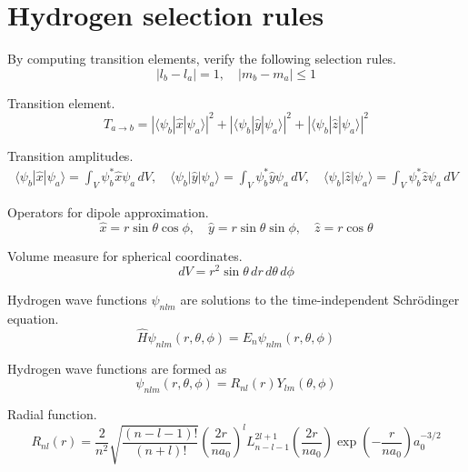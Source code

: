 

\section*{Hydrogen selection rules}

By computing transition elements, verify the following selection rules.
\begin{equation*}
|l_b-l_a|=1,\quad|m_b-m_a|\le1
\end{equation*}

Transition element.
\begin{equation*}
T_{a\rightarrow b}
=|\langle\psi_b|\hat x|\psi_a\rangle|^2
+|\langle\psi_b|\hat y|\psi_a\rangle|^2
+|\langle\psi_b|\hat z|\psi_a\rangle|^2
\end{equation*}

Transition amplitudes.
\begin{gather*}
\langle\psi_b|\hat x|\psi_a\rangle
=\int_V\psi_b^*\hat x\psi_a\,dV,
\quad
\langle\psi_b|\hat y|\psi_a\rangle
=\int_V\psi_b^*\hat y\psi_a\,dV,
\quad
\langle\psi_b|\hat z|\psi_a\rangle
=\int_V\psi_b^*\hat z\psi_a\,dV
\end{gather*}

Operators for dipole approximation.
\begin{equation*}
\hat x=r\sin\theta\cos\phi,
\quad
\hat y=r\sin\theta\sin\phi,
\quad
\hat z=r\cos\theta
\end{equation*}

Volume measure for spherical coordinates.
\begin{equation*}
dV=r^2\sin\theta\,dr\,d\theta\,d\phi
\end{equation*}

Hydrogen wave functions $\psi_{nlm}$ are solutions to
the time-independent Schr\"odinger equation.
\begin{equation*}
\hat H\psi_{nlm}(r,\theta,\phi)=E_n\psi_{nlm}(r,\theta,\phi)
\end{equation*}

Hydrogen wave functions are formed as
\begin{equation*}
\psi_{nlm}(r,\theta,\phi)=R_{nl}(r)Y_{lm}(\theta,\phi)
\end{equation*}

Radial function.
\begin{equation*}
R_{nl}(r)=
\frac{2}{n^2}
\sqrt{\frac{(n-l-1)!}{(n+l)!}}
\left(\frac{2r}{na_0}\right)^l
L_{n-l-1}^{2l+1}\left(\frac{2r}{na_0}\right)
\exp\left(-\frac{r}{na_0}\right)
a_0^{-3/2}
\end{equation*}

